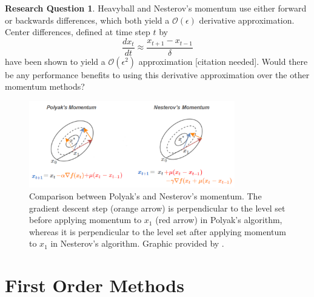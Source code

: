 \documentclass{article}
\newcommand{\dv}[2]{\frac{d #1}{d #2}}
\theoremstyle{definition}
\newtheorem{research}{Research Question}
\begin{document}
\begin{research}
    Heavyball and Nesterov's momentum use either forward or backwards
    differences, which both yield a $\mathcal O(\epsilon)$ derivative approximation.
    Center differences, defined at time step $t$ by 
    \begin{equation}
        \dv{x_t}{t} \approx \frac{x_{t + 1} - x_{t - 1}}{\delta} 
    \end{equation}
    have been shown to yield a $\mathcal O(\epsilon^2)$ approximation [citation
    needed]. Would there be any performance benefits to using this derivative
    approximation over the other momentum methods?
\end{research}

\begin{figure}[t]
    \centering
    \includegraphics[width=0.8\textwidth]{sc1.png}
    \caption{Comparison between
    Polyak’s and Nesterov’s momentum. The gradient descent step (orange arrow)
    is perpendicular to the level set before applying momentum to $x_1$ (red
    arrow) in Polyak’s algorithm, whereas it is perpendicular to the level set
    after applying momentum to $x_1$ in Nesterov’s algorithm. Graphic provided by \citeauthor{nesterovnotes}.}
    \label{fig:sc1-png}
\end{figure}

\section{First Order Methods}
\end{document}
